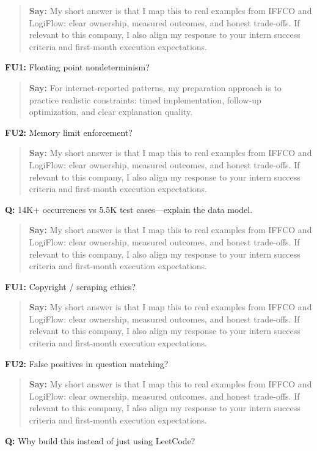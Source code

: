 \documentclass[9pt,a4paper]{article}
\begin{document}
\begin{quote}\small\textbf{Say:} My short answer is that I map this to real examples from IFFCO and LogiFlow: clear ownership, measured outcomes, and honest trade-offs. If relevant to this company, I also align my response to your intern success criteria and first-month execution expectations.\end{quote}
\vspace{2mm}
\textbf{FU1:} Floating point nondeterminism?

\begin{quote}\small\textbf{Say:} For internet-reported patterns, my preparation approach is to practice realistic constraints: timed implementation, follow-up optimization, and clear explanation quality.\end{quote}
\vspace{2mm}
\textbf{FU2:} Memory limit enforcement?

\begin{quote}\small\textbf{Say:} My short answer is that I map this to real examples from IFFCO and LogiFlow: clear ownership, measured outcomes, and honest trade-offs. If relevant to this company, I also align my response to your intern success criteria and first-month execution expectations.\end{quote}
\vspace{2mm}
\textbf{Q:} 14K+ occurrences vs 5.5K test cases---explain the data model.

\begin{quote}\small\textbf{Say:} My short answer is that I map this to real examples from IFFCO and LogiFlow: clear ownership, measured outcomes, and honest trade-offs. If relevant to this company, I also align my response to your intern success criteria and first-month execution expectations.\end{quote}
\vspace{2mm}
\textbf{FU1:} Copyright / scraping ethics?

\begin{quote}\small\textbf{Say:} My short answer is that I map this to real examples from IFFCO and LogiFlow: clear ownership, measured outcomes, and honest trade-offs. If relevant to this company, I also align my response to your intern success criteria and first-month execution expectations.\end{quote}
\vspace{2mm}
\textbf{FU2:} False positives in question matching?

\begin{quote}\small\textbf{Say:} My short answer is that I map this to real examples from IFFCO and LogiFlow: clear ownership, measured outcomes, and honest trade-offs. If relevant to this company, I also align my response to your intern success criteria and first-month execution expectations.\end{quote}
\vspace{2mm}
\textbf{Q:} Why build this instead of just using LeetCode?
\end{document}
